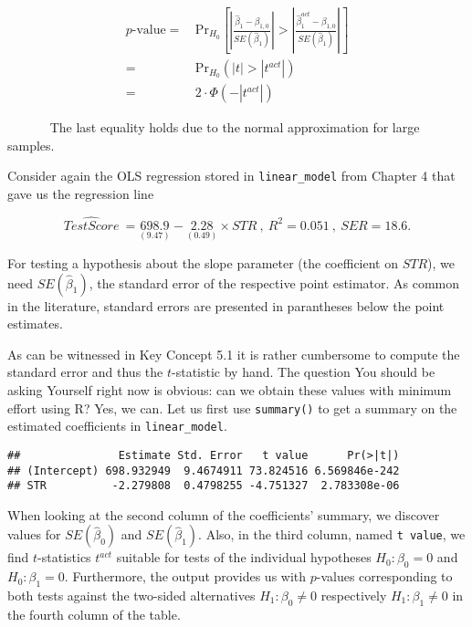 \documentclass[]{book}
\newenvironment{Shaded}{\begin{snugshade}}{\end{snugshade}}
\newcommand{\KeywordTok}[1]{\textcolor[rgb]{0.13,0.29,0.53}{\textbf{#1}}}
\newcommand{\CommentTok}[1]{\textcolor[rgb]{0.56,0.35,0.01}{\textit{#1}}}
\newcommand{\OperatorTok}[1]{\textcolor[rgb]{0.81,0.36,0.00}{\textbf{#1}}}
\newcommand{\NormalTok}[1]{#1}
\theoremstyle{definition}
\theoremstyle{definition}
\theoremstyle{definition}
\theoremstyle{remark}
\begin{document}
\begin{align}
    p \text{-value} =& \, \text{Pr}_{H_0} \left[ \left| \frac{ \hat{\beta}_1 - \beta_{1,0} }{ SE(\hat{\beta}_1) } \right| > \left|        \frac{ \hat{\beta}_1^{act} - \beta_{1,0} }{ SE(\hat{\beta}_1) } \right| \right] \\
    =& \, \text{Pr}_{H_0} (|t| > |t^{act}|) \\
    =& \, 2 \cdot \Phi(-|t^{act}|)
  \end{align}

~~~~~~ The last equality holds due to the normal approximation for large
samples.

Consider again the OLS regression stored in \texttt{linear\_model} from
Chapter 4 that gave us the regression line

\[ \widehat{TestScore} \ = \underset{(9.47)}{698.9} - \underset{(0.49)}{2.28} \times STR \ , \ R^2=0.051 \ , \ SER=18.6. \]

For testing a hypothesis about the slope parameter (the coefficient on
\(STR\)), we need \(SE(\hat{\beta}_1)\), the standard error of the
respective point estimator. As common in the literature, standard errors
are presented in parantheses below the point estimates.

As can be witnessed in Key Concept 5.1 it is rather cumbersome to
compute the standard error and thus the \(t\)-statistic by hand. The
question You should be asking Yourself right now is obvious: can we
obtain these values with minimum effort using R? Yes, we can. Let us
first use \texttt{summary()} to get a summary on the estimated
coefficients in \texttt{linear\_model}.

\begin{Shaded}
\end{Shaded}

\begin{verbatim}
##               Estimate Std. Error   t value      Pr(>|t|)
## (Intercept) 698.932949  9.4674911 73.824516 6.569846e-242
## STR          -2.279808  0.4798255 -4.751327  2.783308e-06
\end{verbatim}

When looking at the second column of the coefficients' summary, we
discover values for \(SE(\hat\beta_0)\) and \(SE(\hat\beta_1)\). Also,
in the third column, named \texttt{t\ value}, we find \(t\)-statistics
\(t^{act}\) suitable for tests of the individual hypotheses
\(H_0: \beta_0=0\) and \(H_0: \beta_1=0\). Furthermore, the output
provides us with \(p\)-values corresponding to both tests against the
two-sided alternatives \(H_1:\beta_0\neq0\) respectively
\(H_1:\beta_1\neq0\) in the fourth column of the table.
\end{document}
